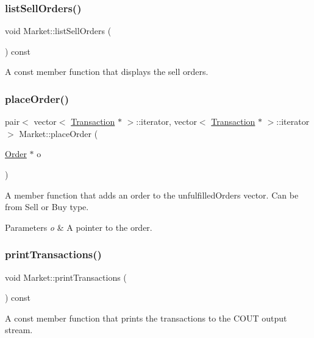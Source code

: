 \subsubsection{\texorpdfstring{list\+Sell\+Orders()}{listSellOrders()}}
{\footnotesize\ttfamily void Market\+::list\+Sell\+Orders (\begin{DoxyParamCaption}{ }\end{DoxyParamCaption}) const}

A const member function that displays the sell orders. \mbox{\label{class_market_adbc97b770d67a3af3258737a00112dc0}} 
\subsubsection{\texorpdfstring{place\+Order()}{placeOrder()}}
{\footnotesize\ttfamily pair$<$ vector$<$ \hyperlink{class_transaction}{Transaction} $\ast$ $>$\+::iterator, vector$<$ \hyperlink{class_transaction}{Transaction} $\ast$ $>$\+::iterator $>$ Market\+::place\+Order (\begin{DoxyParamCaption}\item[{\hyperlink{class_order}{Order} $\ast$}]{o }\end{DoxyParamCaption})}

A member function that adds an order to the unfulfilled\+Orders vector. Can be from Sell or Buy type. 
\begin{DoxyParams}{Parameters}
{\em o} & A pointer to the order. \\
\hline
\end{DoxyParams}
\mbox{\label{class_market_ac3a275c01a109a96f3f923911eb70497}} 
\subsubsection{\texorpdfstring{print\+Transactions()}{printTransactions()}\hspace{0.1cm}{\footnotesize\ttfamily [1/4]}}
{\footnotesize\ttfamily void Market\+::print\+Transactions (\begin{DoxyParamCaption}{ }\end{DoxyParamCaption}) const}

A const member function that prints the transactions to the C\+O\+UT output stream. \mbox{\label{class_market_a5176ada7b9889a1c9eb2cb3b7f1aeb0b}} 
